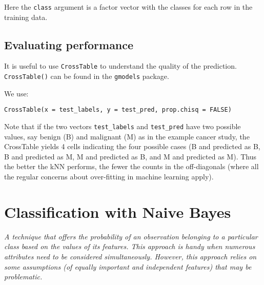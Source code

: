 \documentclass[]{article}
\begin{document}
Here the \verb|class| argument is a factor vector with the classes for each row in the training data.

\subsection{Evaluating performance}

It is useful to use \verb|CrossTable| to understand the quality of the prediction.  \verb|CrossTable()| can be found in the \verb|gmodels| package.

We use: 
\begin{verbatim}
CrossTable(x = test_labels, y = test_pred, prop.chisq = FALSE)
\end{verbatim}
Note that if the two vectors \verb|test_labels| and \verb|test_pred| have two possible values, say benign (B) and malignant (M) as in the example cancer study, the CrossTable yields 4 cells indicating the four possible cases (B and predicted as B, B and predicted as M, M and predicted as B, and M and predicted as M).  Thus the better the kNN performs, the fewer the counts in the off-diagonals (where all the regular concerns about over-fitting in machine learning apply).  

\section{Classification with Naive Bayes}

\emph{A technique that offers the probability of an observation belonging to a particular class based on the values of its features.  This approach is handy when numerous attributes need to be considered simultaneously.  However, this approach relies on some assumptions (of equally important and independent features) that may be problematic.}
\end{document}
